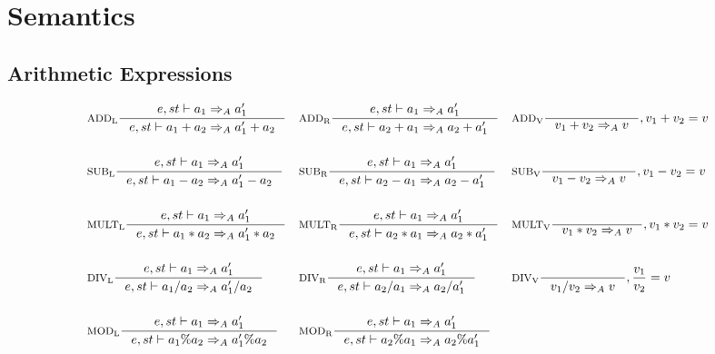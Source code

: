 \section{Semantics}
\subsection{Arithmetic Expressions}
\begin{align*}
&\inference[$\text{ADD}_\text{L}$]{e,st \vdash a_1 \Rightarrow_A a_1'}
                    {e,st \vdash  a_1 + a_2 \Rightarrow_A a_1' + a_2}
&
&\inference[$\text{ADD}_\text{R}$]{e,st \vdash a_1 \Rightarrow_A a_1'}
										{e,st \vdash a_2 + a_1 \Rightarrow_A a_2 + a_1'}
&
&\inference[$\text{ADD}_\text{V}$]{}
                    {v_1 + v_2 \Rightarrow_A v}
										{, v_1 + v_2 = v}
\\\\
&\inference[$\text{SUB}_\text{L}$]{e,st \vdash a_1 \Rightarrow_A a_1'}
                    {e,st \vdash a_1 - a_2 \Rightarrow_A a_1' - a_2}
&
&\inference[$\text{SUB}_\text{R}$]{e,st \vdash a_1 \Rightarrow_A a_1'}
                    {e,st \vdash a_2 - a_1 \Rightarrow_A a_2 - a_1'}
&
&\inference[$\text{SUB}_\text{V}$]{}
                    {v_1 - v_2 \Rightarrow_A v}
										{, v_1 - v_2 = v}
\\\\
&\inference[$\text{MULT}_\text{L}$]{e,st \vdash a_1 \Rightarrow_A a_1'}
                     {e,st \vdash a_1 * a_2 \Rightarrow_A a_1' * a_2}
&
&\inference[$\text{MULT}_\text{R}$]{e,st \vdash a_1 \Rightarrow_A a_1'}
                     {e,st \vdash a_2 * a_1 \Rightarrow_A a_2 * a_1'}
&
&\inference[$\text{MULT}_\text{V}$]{}
                     {v_1 * v_2 \Rightarrow_A v}
										 {, v_1 * v_2 = v}
\\\\
&\inference[$\text{DIV}_\text{L}$]{e,st \vdash a_1 \Rightarrow_A a_1'}
                    {e,st \vdash a_1 / a_2 \Rightarrow_A a_1' / a_2}
&
&\inference[$\text{DIV}_\text{R}$]{e,st \vdash a_1 \Rightarrow_A a_1'}
                    {e,st \vdash a_2 / a_1 \Rightarrow_A a_2 / a_1'}
&
&\inference[$\text{DIV}_\text{V}$]{}
                    {v_1 / v_2 \Rightarrow_A v}
										{, \frac{v_1}{v_2} = v}
\\\\
&\inference[$\text{MOD}_\text{L}$]{e,st \vdash a_1 \Rightarrow_A a_1'}
                    {e,st \vdash a_1 \% a_2 \Rightarrow_A a_1' \% a_2}
&
&\inference[$\text{MOD}_\text{R}$]{e,st \vdash a_1 \Rightarrow_A a_1'}
                    {e,st \vdash a_2 \% a_1 \Rightarrow_A a_2 \% a_1'}

\end{align*}
